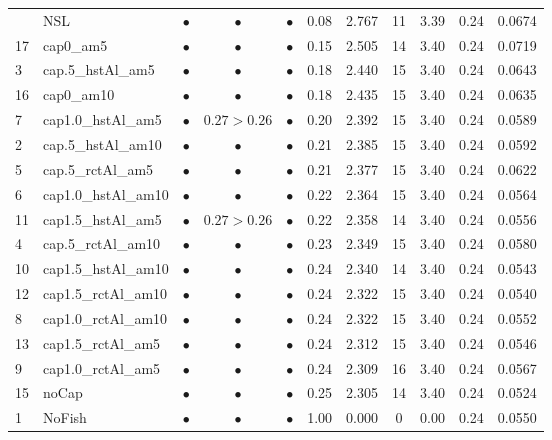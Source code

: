\documentclass[11pt]{book}
\begin{document}
\begin{landscape}
\begin{longtable}[t]{llccccccccc}
\endlastfoot
14 & NSL & $\bullet$ & $\bullet$ & $\bullet$ & 0.08 & 2.767 & 11 & 3.39 & 0.24 & 0.0674\\
17 & cap0\_am5 & $\bullet$ & $\bullet$ & $\bullet$ & 0.15 & 2.505 & 14 & 3.40 & 0.24 & 0.0719\\
3 & cap.5\_hstAl\_am5 & $\bullet$ & $\bullet$ & $\bullet$ & 0.18 & 2.440 & 15 & 3.40 & 0.24 & 0.0643\\
16 & cap0\_am10 & $\bullet$ & $\bullet$ & $\bullet$ & 0.18 & 2.435 & 15 & 3.40 & 0.24 & 0.0635\\
7 & cap1.0\_hstAl\_am5 & $\bullet$ & $0.27>0.26$ & $\bullet$ & 0.20 & 2.392 & 15 & 3.40 & 0.24 & 0.0589\\
2 & cap.5\_hstAl\_am10 & $\bullet$ & $\bullet$ & $\bullet$ & 0.21 & 2.385 & 15 & 3.40 & 0.24 & 0.0592\\
5 & cap.5\_rctAl\_am5 & $\bullet$ & $\bullet$ & $\bullet$ & 0.21 & 2.377 & 15 & 3.40 & 0.24 & 0.0622\\
6 & cap1.0\_hstAl\_am10 & $\bullet$ & $\bullet$ & $\bullet$ & 0.22 & 2.364 & 15 & 3.40 & 0.24 & 0.0564\\
11 & cap1.5\_hstAl\_am5 & $\bullet$ & $0.27>0.26$ & $\bullet$ & 0.22 & 2.358 & 14 & 3.40 & 0.24 & 0.0556\\
4 & cap.5\_rctAl\_am10 & $\bullet$ & $\bullet$ & $\bullet$ & 0.23 & 2.349 & 15 & 3.40 & 0.24 & 0.0580\\
10 & cap1.5\_hstAl\_am10 & $\bullet$ & $\bullet$ & $\bullet$ & 0.24 & 2.340 & 14 & 3.40 & 0.24 & 0.0543\\
12 & cap1.5\_rctAl\_am10 & $\bullet$ & $\bullet$ & $\bullet$ & 0.24 & 2.322 & 15 & 3.40 & 0.24 & 0.0540\\
8 & cap1.0\_rctAl\_am10 & $\bullet$ & $\bullet$ & $\bullet$ & 0.24 & 2.322 & 15 & 3.40 & 0.24 & 0.0552\\
13 & cap1.5\_rctAl\_am5 & $\bullet$ & $\bullet$ & $\bullet$ & 0.24 & 2.312 & 15 & 3.40 & 0.24 & 0.0546\\
9 & cap1.0\_rctAl\_am5 & $\bullet$ & $\bullet$ & $\bullet$ & 0.24 & 2.309 & 16 & 3.40 & 0.24 & 0.0567\\
15 & noCap & $\bullet$ & $\bullet$ & $\bullet$ & 0.25 & 2.305 & 14 & 3.40 & 0.24 & 0.0524\\
1 & NoFish & $\bullet$ & $\bullet$ & $\bullet$ & 1.00 & 0.000 & 0 & 0.00 & 0.24 & 0.0550\\*
\end{longtable}
\end{landscape}
\endgroup{}

\newpage
\end{document}
